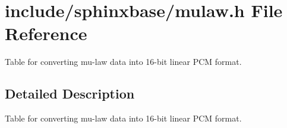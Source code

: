 \section{include/sphinxbase/mulaw.h File Reference}
\label{mulaw_8h}


Table for converting mu-\/law data into 16-\/bit linear P\+C\+M format.  




\subsection{Detailed Description}
Table for converting mu-\/law data into 16-\/bit linear P\+C\+M format. 

